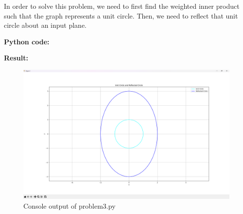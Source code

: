 In order to solve this problem, we need to first find the weighted inner product such that the graph represents a unit circle. Then, we need to reflect that unit circle about an input plane.\\[6pt]

\vspace*{1cm}

\textbf{Python code:}


\clearpage

\textbf{Result:}
\begin{figure}[H]
    \centering
    \includegraphics[width=16cm]{graphics/3.png}
    \caption{Console output of problem3.py}
\end{figure}